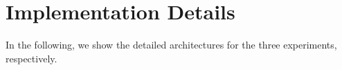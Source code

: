 \documentclass{article}
\begin{document}
{%
% 



    




\section{Implementation Details}
\label{sec:imp}
In the following, we show the detailed architectures for the three experiments, respectively.


}
\end{document}
